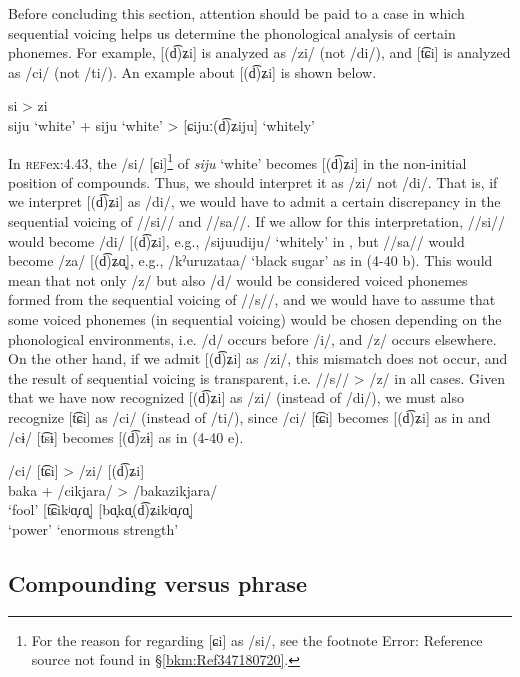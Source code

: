   Before concluding this section, attention should be paid to a case in which sequential voicing helps us determine the phonological analysis of certain phonemes. For example, [(d͡)ʑi] is analyzed as /zi/ (not /di/), and [t͡ɕi] is analyzed as /ci/ (not /ti/). An example about [(d͡)ʑi] is shown below.

\ea  si > zi   \label{ex:4.43}\\
  siju  ‘white’  +  siju  ‘white’  >  [ɕijuː(d͡)ʑiju]  ‘whitely’
\z
  
In \textsc{ref}{ex:4.43}, the /si/ [ɕi]\footnote{For the reason for regarding [ɕi] as /si/, see the footnote Error: Reference source not found in §\ref{bkm:Ref347180720}.} of \textit{siju} ‘white’ becomes [(d͡)ʑi] in the non-initial position of compounds. Thus, we should interpret it as /zi/ not /di/. That is, if we interpret [(d͡)ʑi] as /di/, we would have to admit a certain discrepancy in the sequential voicing of //si// and //sa//. If we allow for this interpretation, //si// would become /di/ [(d͡)ʑi], e.g., /sijuudiju/ ‘whitely’ in , but //sa// would become /za/ [(d͡)ʑɑ̟], e.g., /kˀuruzataa/ ‘black sugar’ as in (4-40 b). This would mean that not only /z/ but also /d/ would be considered voiced phonemes formed from the sequential voicing of //s//, and we would have to assume that some voiced phonemes (in sequential voicing) would be chosen depending on the phonological environments, i.e. /d/ occurs before /i/, and /z/ occurs elsewhere. On the other hand, if we admit [(d͡)ʑi] as /zi/, this mismatch does not occur, and the result of sequential voicing is transparent, i.e. //s// > /z/ in all cases. Given that we have now recognized [(d͡)ʑi] as /zi/ (instead of /di/), we must also recognize [t͡ɕi] as /ci/ (instead of /ti/), since /ci/ [t͡ɕi] becomes [(d͡)ʑi] as in  and /cɨ/ [t͡sɨ] becomes [(d͡)zɨ] as in (4-40 e).

\ea  /ci/ [t͡ɕi] > /zi/ [(d͡)ʑi]   \label{ex:4.44}\\
\glll   baka    +  /cikjara/        >  /bakazikjara/\\
        ‘fool’  {}   [t͡ɕikʲɑ̟ɾɑ̟]    {}     [bɑ̟kɑ̟(d͡)ʑikʲɑ̟ɾɑ̟]\\
           {}     {}  ‘power’          {}    {‘enormous strength’}\\
\z 

\subsection{Compounding versus phrase}\label{sec:4.2.4}


